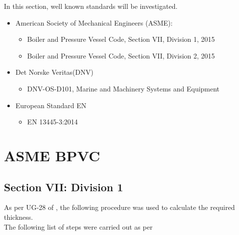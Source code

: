 
In this section, well known standards will be investigated.

\begin{itemize}
    \item American Society of Mechanical Engineers (ASME):
	    \begin{itemize}[label=$\bullet$]
	    	\item Boiler and Pressure Vessel Code, Section VII, Division 1, 2015 \citep{ASMEbvpcVII1}
	    	\item Boiler and Pressure Vessel Code, Section VII, Division 2, 2015 \citep{ASMEbvpcVII2}
	    \end{itemize}
	\item Det Norske Veritas(DNV) \citep{DNVOSD101}
		    \begin{itemize}[label=$\bullet$]
	    	\item DNV-OS-D101, Marine and Machinery Systems and Equipment\citep{ASMEbvpcVII1}
	    \end{itemize}
    \item European Standard EN
        \begin{itemize}[label=$\bullet$]
	       	\item EN 13445-3:2014
	    \end{itemize}
\end{itemize}

\section{ASME BPVC}

\subsection{Section VII: Division 1}
As per UG-28 of \citep{ASMEbvpcVII1}, the following procedure was used to calculate the required thickness.\\

The following list of steps were carried out as per \citep{ASMEbvpcVII1}\\

